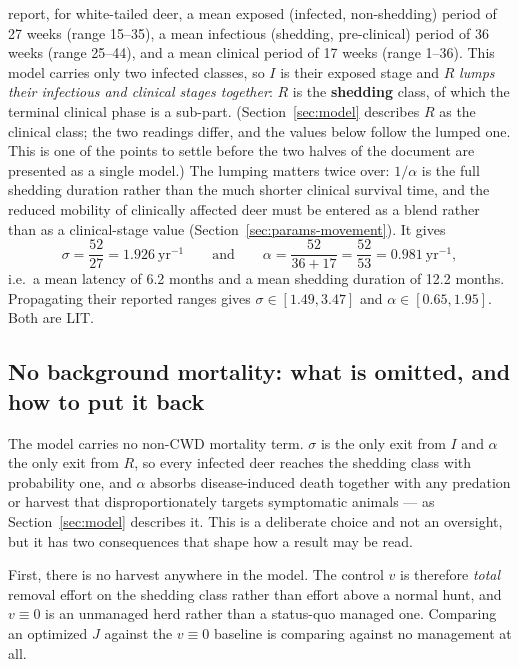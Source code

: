 \documentclass[11pt]{article}
\newcommand{\tagLIT}{{\footnotesize\textsf{\textcolor{green!40!black}{LIT}}}}
\begin{document}
\citet{Almberg2011} report, for white-tailed deer, a mean exposed (infected, non-shedding) period of 27 weeks (range 15--35), a mean infectious (shedding, pre-clinical) period of 36 weeks (range 25--44), and a mean clinical period of 17 weeks (range 1--36). This model carries only two infected classes, so $I$ is their exposed stage and $R$ \emph{lumps their infectious and clinical stages together}: $R$ is the \textbf{shedding} class, of which the terminal clinical phase is a sub-part. (Section~\ref{sec:model} describes $R$ as the clinical class; the two readings differ, and the values below follow the lumped one. This is one of the points to settle before the two halves of the document are presented as a single model.) The lumping matters twice over: $1/\alpha$ is the full shedding duration rather than the much shorter clinical survival time, and the reduced mobility of clinically affected deer must be entered as a blend rather than as a clinical-stage value (Section~\ref{sec:params-movement}). It gives
\[
\sigma = \frac{52}{27} = 1.926\ \mathrm{yr}^{-1}
\qquad\text{and}\qquad
\alpha = \frac{52}{36+17} = \frac{52}{53} = 0.981\ \mathrm{yr}^{-1},
\]
i.e.\ a mean latency of 6.2 months and a mean shedding duration of 12.2 months. Propagating their reported ranges gives $\sigma \in [1.49, 3.47]$ and $\alpha \in [0.65, 1.95]$. Both are \tagLIT{}.

\subsection{No background mortality: what is omitted, and how to put it back}
\label{sec:params-mortality}

The model carries no non-CWD mortality term. $\sigma$ is the only exit from $I$ and $\alpha$ the only exit from $R$, so every infected deer reaches the shedding class with probability one, and $\alpha$ absorbs disease-induced death together with any predation or harvest that disproportionately targets symptomatic animals --- as Section~\ref{sec:model} describes it. This is a deliberate choice and not an oversight, but it has two consequences that shape how a result may be read.

First, there is no harvest anywhere in the model. The control $v$ is therefore \emph{total} removal effort on the shedding class rather than effort above a normal hunt, and $v\equiv0$ is an unmanaged herd rather than a status-quo managed one. Comparing an optimized $J$ against the $v\equiv0$ baseline is comparing against no management at all.
\end{document}
